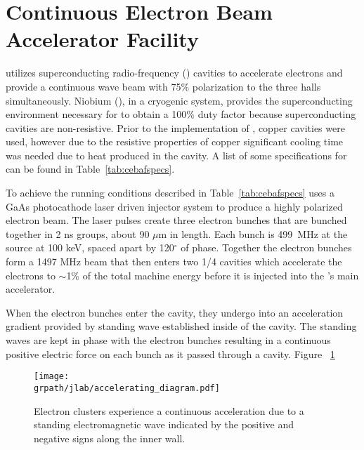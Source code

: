 \section{Continuous Electron Beam Accelerator Facility}\label{sec:cebaf.desc}

 utilizes superconducting radio-frequency (\label{abbr:srf}) cavities to accelerate electrons and provide a continuous wave beam with 75\% polarization to the three halls simultaneously.
Niobium (\label{abbr:nb}), in a cryogenic system, provides the superconducting environment necessary for  to obtain a 100\% duty factor because superconducting cavities are non-resistive. Prior to the implementation of , copper \label{abbr:rf} cavities were used, however due to the resistive properties of copper significant cooling time was needed due to heat produced in the cavity. A list of some specifications for  can be found in Table~\ref{tab:cebafspecs}.

 

To achieve the running conditions described in Table~\ref{tab:cebafspecs}  uses a GaAs photocathode laser driven injector system to produce a highly polarized electron beam. The laser pulses create three electron bunches that are bunched together in 2 ns groups, about 90 $\mu$m in length. Each bunch is 499~MHz at the source at 100 keV, spaced apart by 120$^\circ$ of  phase. Together the electron bunches form a 1497 MHz beam that then enters two 1/4  cavities which accelerate the electrons to $\sim$1\% of the total machine energy before it is injected into the 's main accelerator. 

When the electron bunches enter the   cavity, they undergo into an acceleration gradient provided by  standing wave established inside of the cavity. The standing waves are kept in phase with the electron bunches resulting in a continuous positive electric force on each bunch as it passed through a cavity. Figure ~\ref{fig:jlab.accel}

\begin{figure}\begin{center}
\texttt{[image: \\grpath/jlab/accelerating\_diagram.pdf]}
\caption[Accelerating Cavity Diagram]{\label{fig:jlab.accel}Electron clusters experience a continuous acceleration due to a standing electromagnetic wave indicated by the positive and negative signs along the inner wall.}
\end{center}\end{figure}

